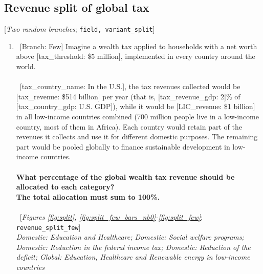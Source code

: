  \subsection*{Revenue split of global tax} 
 [\textit{Two random branches};  \verb|field, variant_split|] 
 \begin{enumerate}[resume] 
\item ~[Branch: Few] \label{q:revenue_split_few} Imagine a wealth tax applied to households with a net worth above [tax\_threshold: \$5 million], implemented in every country around the world.
~\\\\ 
~[tax\_country\_name: In the U.S.], the tax revenues collected would be [tax\_revenue: \$514 billion] per year (that is, [tax\_revenue\_gdp: 2]\% of [tax\_country\_gdp: U.S. GDP]), while it would be [LIC\_revenue: \$1 billion] in all low-income countries combined (700 million people live in a low-income country, most of them in Africa).
Each country would retain part of the revenues it collects and use it for different domestic purposes. The remaining part would be pooled globally to finance sustainable development in low-income countries.
~\\\\\textbf{What percentage of the global wealth tax revenue should be allocated to each category?} \\\textbf{The total allocation must sum to 100\%.}\\\\ 
~[\textit{Figures \ref{fig:split}, \ref{fig:split_few_bars_nb0}-\ref{fig:split_few}}; 
\verb|revenue_split_few|]
  \\ \textit{Domestic: Education and Healthcare; Domestic: Social welfare programs; Domestic: Reduction in the federal income tax; Domestic: Reduction of the deficit; Global: Education, Healthcare and Renewable energy in low-income countries}


\end{enumerate}
